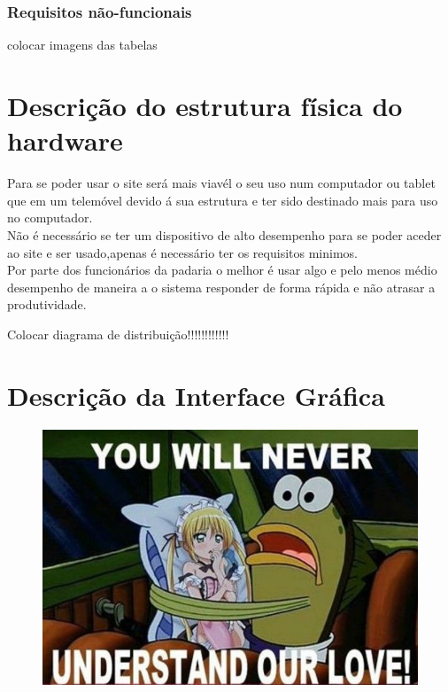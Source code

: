 \subsubsection{Requisitos não-funcionais}
colocar imagens das tabelas
\section{Descrição do estrutura física do hardware}
Para se poder usar o site será mais viavél o seu uso num computador ou tablet que em um telemóvel devido á sua estrutura e ter sido destinado mais para uso no computador. \\
Não é necessário se ter um dispositivo de alto desempenho para se poder aceder ao site e ser usado,apenas é necessário ter os requisitos minimos.\\
Por parte dos funcionários da padaria o melhor é usar algo e pelo menos médio desempenho de maneira a o sistema responder de forma rápida e não atrasar a produtividade.

Colocar diagrama de distribuição!!!!!!!!!!!!

\section{Descrição da Interface Gráfica}

\begin{figure}
	\centering
	\includegraphics{peixe}
	\caption{}
	\label{fig:peixe}
\end{figure}
